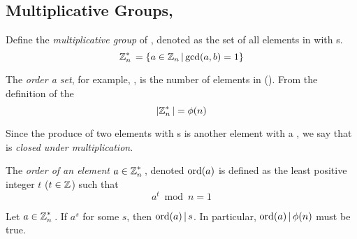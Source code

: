 \subsection{\texorpdfstring{Multiplicative Groups, \TextMultiplicativeGroupN{}}{Multiplicative Groups}}\label{Multiplicative_Groups}
\begin{definition}\label{def:Multiplicative_Group}
  Define the \emph{multiplicative group} of \TextIntsModN{}, denoted \TextMultiplicativeGroupN{} as the set of all elements in \TextIntsModN{} with s.
  \begin{equation}\label{eq:Multiplicative_Group}
    \operatorname{\mathbb{Z}}_{n}^{*}{} = \lbrace a \in \operatorname{\mathbb{Z}}_{n}{} \vert \gcd(a, b) = 1 \rbrace
  \end{equation}
\end{definition}

\begin{definition}\label{def:Set_Order}
  The \emph{order a set}, for example, \TextMultiplicativeGroupN{}, is the number of elements in \TextMultiplicativeGroupN{} (\TextSetOrder{\MultiplicativeGroupN{}}).
  From the definition of the 
  \begin{equation}\label{eq:Set_Order_Euler_Phi_Function}
    \lvert \operatorname{\mathbb{Z}}_{n}^{*}{} \rvert = \phi(n)
  \end{equation}

  \begin{remark}\label{rmk:Set_Order_Closed_Multiplication}
    Since the produce of two elements with s is another element with a , we say that \TextSetOrder{\MultiplicativeGroupN{}} is \emph{closed under multiplication}.
  \end{remark}
\end{definition}

\begin{definition}\label{def:Element_Order}
  The \emph{order of an element} $a \in \operatorname{\mathbb{Z}}_{n}^{*}{}$, denoted $\operatorname{\operatorname{ord}}(a)$ is defined as the least positive integer $t$ ($t \in \operatorname{\mathbb{Z}}$) such that
  \begin{equation}\label{eq:Element_Order}
    a^{t} \bmod n = 1
  \end{equation}
\end{definition}

\begin{lemma}\label{lemma:Element_Order}
  Let $a \in \operatorname{\mathbb{Z}}_{n}^{*}{}$.
  If $a^{s}$ for some $s$, then $\operatorname{\operatorname{ord}}(a) \operatorname{\vert} s$.
  In particular, $\operatorname{\operatorname{ord}}(a) \operatorname{\vert} \phi(n)$ must be true.
\end{lemma}

